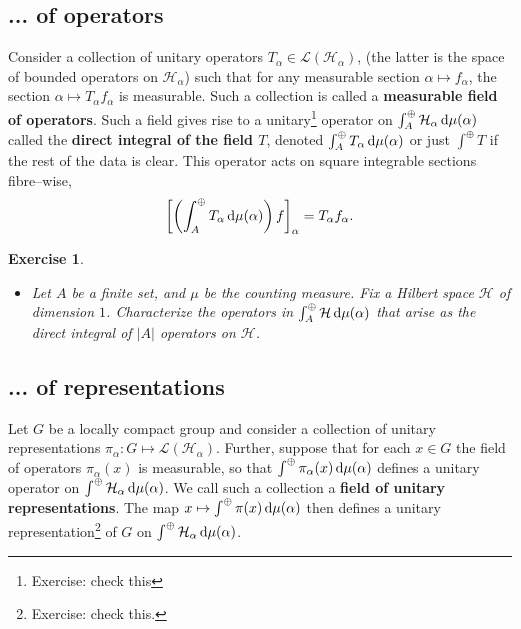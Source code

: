 \documentclass[11pt]{amsart}
\newtheorem{ex}{Exercise}
\renewcommand{\H}{\mathcal{H}}
\renewcommand{\L}{\mathcal{L}}
\begin{document}
\subsection{... of operators}
	Consider a collection of unitary operators $T_{\alpha} \in \L(\H_{\alpha})$, (the latter is the space of bounded operators on $\H_{\alpha}$) such that for any measurable section $\alpha \mapsto f_{\alpha}$, the section $\alpha \mapsto T_{\alpha} f_{\alpha}$ is measurable. Such a collection is called a {\bf measurable field of operators}. Such a field gives rise to a unitary\footnote{Exercise: check this} operator on $\int^{\oplus}_{A}\H_{\alpha}\dop \mu(\alpha)$ called the {\bf direct integral of the field $T$},  denoted $\int^{\oplus}_{A}T_{\alpha} \,{\rm d} \mu(\alpha)$ or just $\int^{\oplus}T$ if the rest of the data is clear. This operator acts on square integrable sections fibre--wise, 
	\begin{align*}
		\left[\left(\int^{\oplus}_{A}T_{\alpha} \,{\rm d} \mu(\alpha)\right) f\right]_{\alpha}=T_{\alpha}f_{\alpha}. 
	\end{align*}
\begin{ex}
	\begin{itemize}
		\item  Let $A$ be a finite set, and $\mu$ be the counting measure. Fix a Hilbert space $\H$ of dimension $1$. Characterize the operators in $\int^{\oplus}_{A}\H \dop \mu(\alpha)$ that arise as the direct integral of $|A|$ operators on $\H$.
	\end{itemize}
\end{ex}
\subsection{... of representations}
	Let $G$ be a locally compact group and consider a collection of unitary representations $\pi_{\alpha}:G \mapsto \L(\H_{\alpha})$. Further, suppose that for each $x\in G$ the field of operators $\pi_{\alpha}(x)$  is measurable, so that $\int^{\oplus} \pi_{\alpha} (x)\,{\rm d} \mu (\alpha)$ defines a unitary operator on $\int^{\oplus}\H_{\alpha} \dop \mu(\alpha)$. We call such a collection a {\bf field of unitary representations}. The map $x\mapsto \int^{\oplus}\pi(x)\,{\rm d} \mu(\alpha)$ then defines a unitary representation\footnote{Exercise: check this.} of $G$ on $\int^{\oplus}\H_{\alpha} \dop \mu(\alpha)$. 
\end{document}
